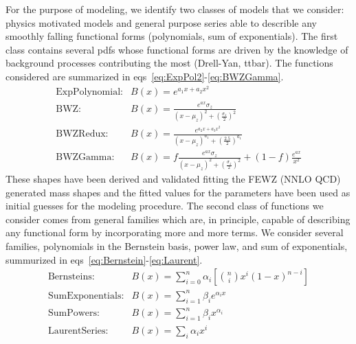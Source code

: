 For the purpose of modeling, we identify two classes of models that we consider: physics motivated models and general purpose series able to describle any smoothly falling functional forms (polynomials, sum of exponentials). The first class contains several pdfs whose functional forms are driven by the knowledge of background processes contributing the most (Drell-Yan, ttbar). The functions considered are summarized in eqs~\ref{eq:ExpPol2}-\ref{eq:BWZGamma}.
\begin{align}
        \label{eq:ExpPol2}
        \text{ExpPolynomial:}& {B(x)} = {e^{a_{1}x + a_{2}x^2}} \\
        \label{eq:BWZ}
        \text{BWZ:}& {B(x)} = {\frac{e^{ax}\sigma_{z}}{(x-\mu_{z})^2 + (\frac{\sigma_{z}}{2})^2}} \\
        \label{eq:BWZRedux}
        \text{BWZRedux:}& {B(x)} = {\frac{e^{a_{2}x + a_{3}x^2}}{(x-\mu_{z})^{a_{1}} + (\frac{2.5}{2})^{a_{1}}}} \\
        \label{eq:BWZGamma}
        \text{BWZGamma:}& {B(x)} = {f\frac{e^{ax}\sigma_{z}}{(x-\mu_{z})^2 + (\frac{\sigma_{z}}{2})^2} + (1-f)\frac{e^{ax}}{x^2}}
\end{align}
These shapes have been derived and validated fitting the FEWZ (NNLO QCD) generated mass shapes and the fitted values for the parameters have been used as initial guesses for the modeling procedure. The second class of functions we consider comes from general families which are, in principle, capable of describing any functional form by incorporating more and more terms. We consider several families, polynomials in the Bernstein basis, power law, and sum of exponentials, summurized in eqs~\ref{eq:Bernstein}-\ref{eq:Laurent}.
\begin{align}
        \label{eq:Bernstein}
        \text{Bernsteins:}& {B(x)} = {\sum_{i=0}^{n} \alpha_i[\binom{n}{i}x^{i}(1-x)^{n-i}]} \\
        \label{eq:SumExponentials}
        \text{SumExponentials:}& {B(x)} = {\sum_{i=1}^{n} \beta_{i}e^{\alpha_{i}x}}\\
        \label{eq:SumPowers}
        \text{SumPowers:}& {B(x)} = {\sum_{i=1}^{n} \beta_{i}x^{\alpha_{i}}}\\
        \label{eq:Laurent}
        \text{LaurentSeries:}& {B(x)} = {\sum_{i} \alpha_{i}x^{i}}
\end{align}

